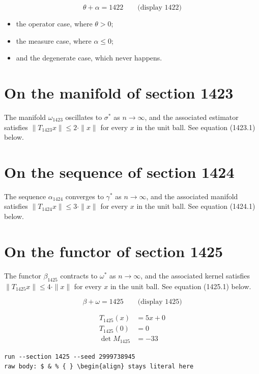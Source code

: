 \documentclass{article}
\begin{document}
$$
\theta + \alpha = 1422 \qquad \text{(display 1422)}
$$

\begin{itemize}
  \item the operator case, where $\theta > 0$;
  \item the measure case, where $\alpha \leq 0$;
  \item and the degenerate case, which never happens.
\end{itemize}

\section{On the manifold of section 1423}
The manifold $\omega_{1423}$ oscillates to $\sigma^{*}$ as $n \to \infty$,
and the associated estimator satisfies $\|T_{1423} x\| \leq 2 \cdot \|x\|$
for every $x$ in the unit ball. See equation (1423.1) below.

\section{On the sequence of section 1424}
The sequence $\alpha_{1424}$ converges to $\gamma^{*}$ as $n \to \infty$,
and the associated manifold satisfies $\|T_{1424} x\| \leq 3 \cdot \|x\|$
for every $x$ in the unit ball. See equation (1424.1) below.

\section{On the functor of section 1425}
The functor $\beta_{1425}$ contracts to $\omega^{*}$ as $n \to \infty$,
and the associated kernel satisfies $\|T_{1425} x\| \leq 4 \cdot \|x\|$
for every $x$ in the unit ball. See equation (1425.1) below.

$$
\beta + \omega = 1425 \qquad \text{(display 1425)}
$$

\begin{align}
T_{1425}(x) &= 5 x + 0 \\
T_{1425}(0) &= 0 \\
\det M_{1425} &= -33
\end{align}

\begin{verbatim}
run --section 1425 --seed 2999738945
raw body: $ & % { } \begin{align} stays literal here
\end{verbatim}
\end{document}

